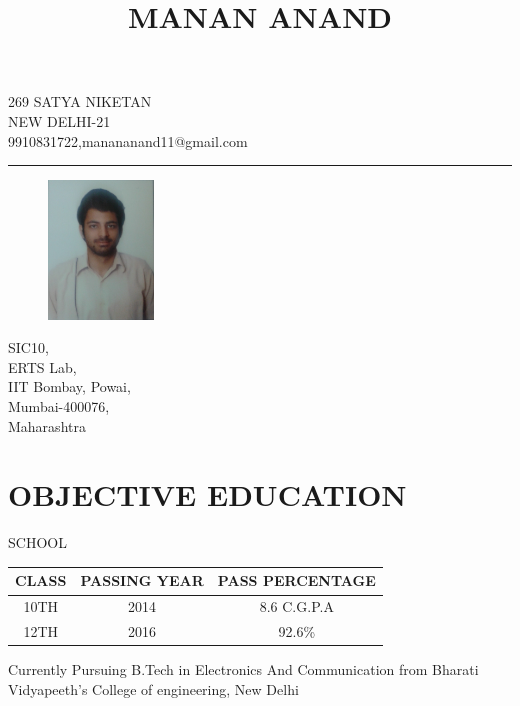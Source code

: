 \documentclass{article}
\date{}
\begin{document}
\title{MANAN ANAND}
\maketitle
\vspace{-2.2cm}

\begin{center}

{\large 269 SATYA NIKETAN\\
NEW DELHI-21\\
9910831722,manananand11@gmail.com\par} 
\end{center}
\noindent\rule{15cm}{1pt}


\begin{figure}
    \centering
    \includegraphics[width=0.25\textwidth]{manan_resume}
\end{figure}

SIC10,\\
ERTS Lab,\\
IIT Bombay, Powai,\\
Mumbai-400076,\\
Maharashtra

\section{OBJECTIVE EDUCATION}
\begin{center}
 SCHOOL
\end{center}

\begin{tabular}{ |c|c|c| } 
 \hline
 CLASS  & PASSING YEAR & PASS PERCENTAGE \\ 
\hline
 10TH & 2014 & 8.6 C.G.P.A \\ 
 12TH & 2016 & 92.6\% \\
 \hline
\end{tabular}

\large Currently Pursuing B.Tech in Electronics And Communication from Bharati Vidyapeeth's College of engineering, New Delhi
\end{document}
